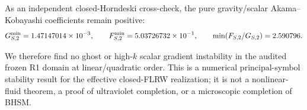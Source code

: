 As an independent closed-Horndeski cross-check, the pure gravity/scalar
Akama--Kobayashi coefficients remain positive:
\begin{equation}
G_{S,2}^{\rm min}=1.47147014\times10^{-3},
\qquad
F_{S,2}^{\rm min}=5.03726732\times10^{-1},
\qquad
\min(F_{S,2}/G_{S,2})
=2.590796.
\end{equation}

We therefore find no ghost or high-$k$ scalar gradient instability in the
audited frozen R1 domain at linear/quadratic order. This is a numerical
principal-symbol stability result for the effective closed-FLRW realization;
it is not a nonlinear-fluid theorem, a proof of ultraviolet completion, or a
microscopic completion of BHSM.
